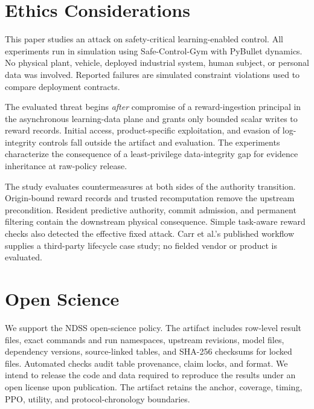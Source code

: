 \section*{Ethics Considerations}

This paper studies an attack on safety-critical learning-enabled control.  All
experiments run in simulation using Safe-Control-Gym with PyBullet dynamics.
No physical plant, vehicle, deployed industrial system, human subject, or
personal data was involved.  Reported failures are simulated constraint
violations used to compare deployment contracts.

The evaluated threat begins \emph{after} compromise of a reward-ingestion
principal in the asynchronous learning-data plane and grants only bounded
scalar writes to reward records.  Initial access, product-specific
exploitation, and evasion of log-integrity controls fall outside the artifact
and evaluation.  The experiments characterize the consequence of a
least-privilege data-integrity gap for evidence inheritance at raw-policy
release.

The study evaluates countermeasures at both sides of the authority transition.
Origin-bound reward records and trusted recomputation remove the upstream
precondition.  Resident predictive authority, commit admission, and permanent
filtering contain the downstream physical consequence.  Simple task-aware
reward checks also detected the effective fixed attack.  Carr et al.'s
published workflow supplies a third-party lifecycle case study; no fielded
vendor or product is evaluated.

\section*{Open Science}

We support the NDSS open-science policy.  The artifact includes row-level
result files, exact commands and run namespaces, upstream revisions, model
files, dependency versions, source-linked tables, and SHA-256 checksums for
locked files.  Automated checks audit table provenance, claim locks, and
format.  We intend to release the code and data required to reproduce the
results under an open license upon publication.  The artifact retains the
anchor, coverage, timing, PPO, utility, and protocol-chronology boundaries.
